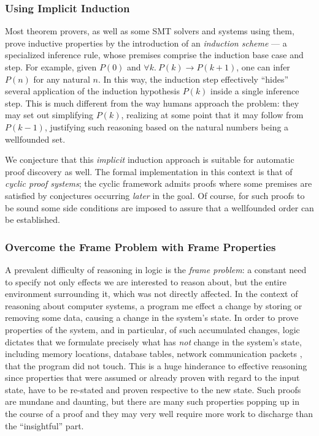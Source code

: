 \subsubsection{Using Implicit Induction}

Most theorem provers, as well as some SMT solvers and systems using them,
prove inductive properties by the introduction of an \emph{induction scheme} ---
a specialized inference rule, whose premises comprise the induction base case
and step.
For example, given $P(0)$ and $\forall k.~ P(k)\rightarrow P(k+1)$,
one can infer $P(n)$ for any natural $n$.
In this way, the induction step effectively ``hides'' several application of
the induction hypothesis $P(k)$ inside a single inference step.
This is much different from the way humans approach the problem: they may set
out simplifying $P(k)$, realizing at some point that it may follow from $P(k-1)$,
justifying such reasoning based on the natural numbers being a wellfounded set.

We conjecture that this \emph{implicit} induction approach is suitable for
automatic proof discovery as well.
The formal implementation in this context is that of \emph{cyclic proof systems};
the cyclic framework admits proofs where some premises are satisfied by
conjectures occurring \emph{later} in the goal.
Of course, for such proofs to be sound some side conditions are imposed to assure
that a wellfounded order can be established.


\subsubsection{Overcome the Frame Problem with Frame Properties}

A prevalent difficulty of reasoning in logic is the \emph{frame problem}:
a constant need to specify not only effects we are interested to reason about,
but the entire environment surrounding it, which was not directly affected.
In the context of reasoning about computer systems, a program me effect a change
by storing or removing some data, causing a change in the system's state.
In order to prove properties of the system, and in particular, of such
accumulated changes, logic dictates that we formulate precisely what has
\emph{not} change in the system's state, including memory locations, database
tables, network communication packets \etc, that the program did not touch.
This is a huge hinderance to effective reasoning since properties that were
assumed or already proven with regard to the input state, have to be
re-stated and proven respective to the new state.
Such proofs are mundane and daunting, but there are many such properties
popping up in the course of a proof and they may very well require more work to
discharge than the ``insightful'' part.

